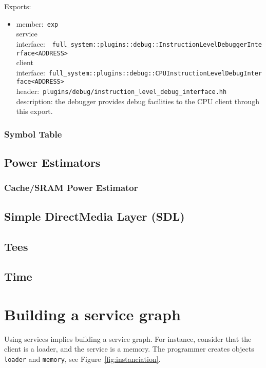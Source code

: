 \noindent Exports:
\begin{itemize}
\item member:~\texttt{exp}\\
service interface:~{\scriptsize ~\texttt{full\_system::plugins::debug::InstructionLevelDebuggerInterface<ADDRESS>}}\\
client interface:~{\scriptsize \texttt{full\_system::plugins::debug::CPUInstructionLevelDebugInterface<ADDRESS>}}\\
header:~{\scriptsize \texttt{plugins/debug/instruction\_level\_debug\_interface.hh}}\\
description: the debugger provides debug facilities to the CPU client through this export.
\end{itemize}


\subsubsection{Symbol Table}

\subsection{Power Estimators}

\subsubsection{Cache/SRAM Power Estimator}

\subsection{Simple DirectMedia Layer (SDL)}

\subsection{Tees}

\subsection{Time}

\section{Building a service graph}
\label{building_a_service_graph}

Using services implies building a service graph.
For instance, consider that the client is a loader, and the service is a memory.
The programmer creates objects \texttt{loader} and \texttt{memory}, see Figure~\ref{fig:instanciation}.

